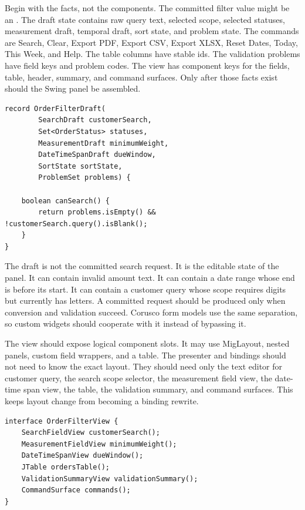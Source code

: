 Begin with the facts, not the components. The committed filter value might be
an . The draft state contains raw query text, selected scope,
selected statuses, measurement draft, temporal draft, sort state, and problem
state. The commands are Search, Clear, Export PDF, Export CSV, Export XLSX,
Reset Dates, Today, This Week, and Help. The table columns have stable ids.
The validation problems have field keys and problem codes. The view has
component keys for the fields, table, header, summary, and command surfaces.
Only after those facts exist should the Swing panel be assembled.

\begin{lstlisting}[caption={A practical panel starts with a draft model.}]
record OrderFilterDraft(
        SearchDraft customerSearch,
        Set<OrderStatus> statuses,
        MeasurementDraft minimumWeight,
        DateTimeSpanDraft dueWindow,
        SortState sortState,
        ProblemSet problems) {

    boolean canSearch() {
        return problems.isEmpty() && !customerSearch.query().isBlank();
    }
}
\end{lstlisting}

The draft is not the committed search request. It is the editable state of the
panel. It can contain invalid amount text. It can contain a date range whose
end is before its start. It can contain a customer query whose scope requires
digits but currently has letters. A committed request should be produced only
when conversion and validation succeed. Corusco form models use the same
separation, so custom widgets should cooperate with it instead of bypassing
it.

The view should expose logical component slots. It may use MigLayout, nested
panels, custom field wrappers, and a table. The presenter and bindings should
not need to know the exact layout. They should need only the text editor for
customer query, the search scope selector, the measurement field view, the
date-time span view, the table, the validation summary, and command surfaces.
This keeps layout change from becoming a binding rewrite.

\begin{lstlisting}[caption={The view contract names logical slots, not layout details.}]
interface OrderFilterView {
    SearchFieldView customerSearch();
    MeasurementFieldView minimumWeight();
    DateTimeSpanView dueWindow();
    JTable ordersTable();
    ValidationSummaryView validationSummary();
    CommandSurface commands();
}
\end{lstlisting}

